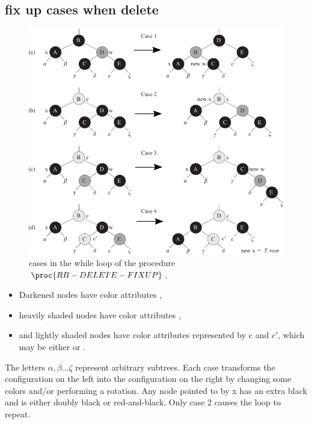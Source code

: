 \documentclass[UTF8,11pt,openany]{ctexbook}
\newenvironment{myitemize}
{ \begin{itemize}
	\setlength{\itemsep}{0pt}
	\setlength{\parskip}{0pt}
	\setlength{\parsep}{0pt}     }
{ \end{itemize}                  }
\begin{document}
\subsection{fix up cases when delete}
\begin{figure}[h] %
	\centering %
	\includegraphics[width=1\textwidth]{vector/red-black-tree/delete/fixup-cases.pdf} %
	\caption{ cases in the while loop of the procedure $ \proc{RB-DELETE-FIXUP}  $.  } %
	\label{red_black_tree_sample1} %
\end{figure}%

\begin{myitemize}
	\item {Darkened} nodes have color attributes , 
	\item heavily shaded nodes have color attributes , 
	\item and lightly shaded nodes have color attributes represented by c and $c'$, which may be either  or . 
\end{myitemize}  
The letters
$\alpha,\beta...\zeta$ represent arbitrary subtrees. Each case transforms the configuration on the left into the
configuration on the right by changing some colors and/or performing a rotation. Any node pointed
to by x has an extra black and is either doubly black or red-and-black. Only case 2 causes the loop to
repeat.
\end{document}
